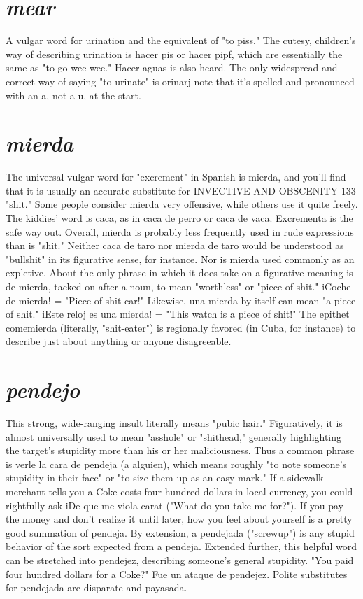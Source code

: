 \section{\emph{mear}}

A vulgar word for urination and the equivalent of "to piss."
The cutesy, children's way of describing urination is hacer pis or hacer
pipf, which are essentially the same as "to go wee-wee." Hacer aguas
is also heard. The only widespread and correct way of saying "to urinate" is orinarj note that it's spelled and pronounced with an a, not a
u, at the start.

\section{\emph{mierda}}

The universal vulgar word for "excrement" in Spanish is
mierda, and you'll find that it is usually an accurate substitute for
INVECTIVE AND OBSCENITY 133
"shit." Some people consider mierda very offensive, while others use it
quite freely. The kiddies' word is caca, as in caca de perro or caca de
vaca. Excrementa is the safe way out.
Overall, mierda is probably less frequently used in rude expressions than is "shit." Neither caca de taro nor mierda de taro
would be understood as "bullshit" in its figurative sense, for instance.
Nor is mierda used commonly as an expletive. About the only phrase
in which it does take on a figurative meaning is de mierda, tacked
on after a noun, to mean "worthless" or "piece of shit." iCoche de
mierda! = "Piece-of-shit car!" Likewise, una mierda by itself can
mean "a piece of shit." iEste reloj es una mierda! = "This watch is a
piece of shit!" The epithet comemierda (literally, "shit-eater") is regionally favored (in Cuba, for instance) to describe just about anything
or anyone disagreeable.

\section{\emph{pendejo}}

This strong, wide-ranging insult literally means "pubic hair."
Figuratively, it is almost universally used to mean "asshole" or "shithead," generally highlighting the target's stupidity more than his or
her maliciousness. Thus a common phrase is verle la cara de pendeja
(a alguien), which means roughly "to note someone's stupidity in their
face" or "to size them up as an easy mark." If a sidewalk merchant
tells you a Coke costs four hundred dollars in local currency, you could
rightfully ask iDe que me viola carat ("What do you take me for?"). If
you pay the money and don't realize it until later, how you feel about
yourself is a pretty good summation of pendeja. By extension, a pendejada ("screwup") is any stupid behavior of the sort expected from a
pendeja. Extended further, this helpful word can be stretched into pendejez, describing someone's general stupidity. "You paid four hundred
dollars for a Coke?" Fue un ataque de pendejez. Polite substitutes for
pendejada are disparate and payasada.

